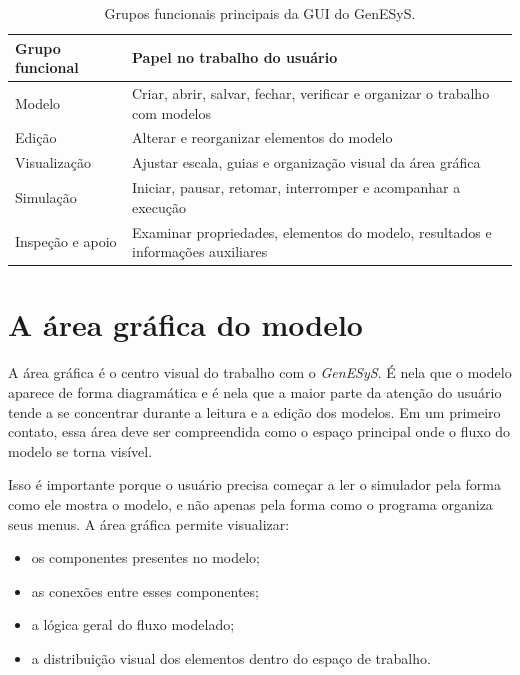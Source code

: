 \begin{table}[htbp]
    \centering
    \caption{Grupos funcionais principais da GUI do GenESyS.}
    \label{tab:cap3_grupos_funcionais}
    \small
    \begin{tabular}{|p{4.0cm}|p{7.4cm}|}
        \hline
        \textbf{Grupo funcional} & \textbf{Papel no trabalho do usuário} \\
        \hline
        Modelo & Criar, abrir, salvar, fechar, verificar e organizar o trabalho com modelos \\
        \hline
        Edição & Alterar e reorganizar elementos do modelo \\
        \hline
        Visualização & Ajustar escala, guias e organização visual da área gráfica \\
        \hline
        Simulação & Iniciar, pausar, retomar, interromper e acompanhar a execução \\
        \hline
        Inspeção e apoio & Examinar propriedades, elementos do modelo, resultados e informações auxiliares \\
        \hline
    \end{tabular}
\end{table}

\section{A área gráfica do modelo}
\label{sec:cap3_area_grafica_modelo}

A área gráfica é o centro visual do trabalho com o \textit{GenESyS}. É nela que o modelo aparece de forma diagramática e é nela que a maior parte da atenção do usuário tende a se concentrar durante a leitura e a edição dos modelos. Em um primeiro contato, essa área deve ser compreendida como o espaço principal onde o fluxo do modelo se torna visível.

Isso é importante porque o usuário precisa começar a ler o simulador pela forma como ele mostra o modelo, e não apenas pela forma como o programa organiza seus menus. A área gráfica permite visualizar:
\begin{itemize}
    \item os componentes presentes no modelo;
    \item as conexões entre esses componentes;
    \item a lógica geral do fluxo modelado;
    \item a distribuição visual dos elementos dentro do espaço de trabalho.
\end{itemize}

